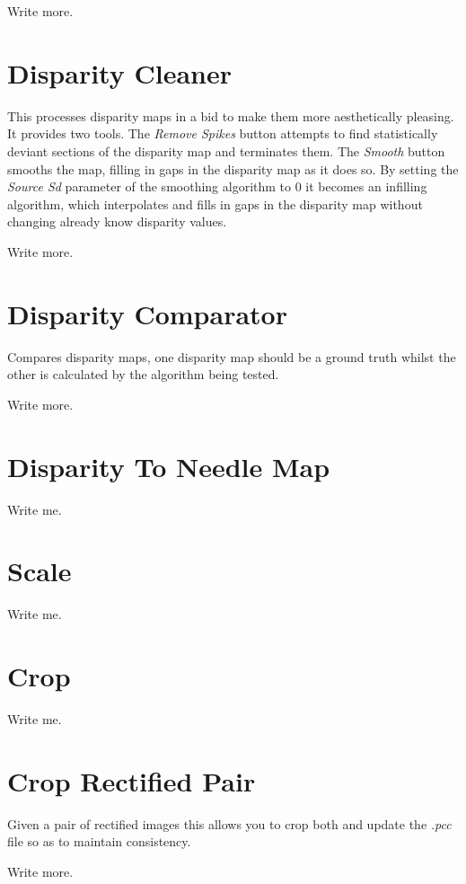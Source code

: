 \documentclass[10pt,a4paper,twoside]{article}
\begin{document}
Write more.



\section{Disparity Cleaner}
This processes disparity maps in a bid to make them more aesthetically pleasing.
It provides two tools.
The \emph{Remove Spikes} button attempts to find statistically deviant sections of the disparity map and terminates them.
The \emph{Smooth} button smooths the map, filling in gaps in the disparity map as it does so.
By setting the \emph{Source Sd} parameter of the smoothing algorithm to $0$ it becomes an infilling algorithm, which interpolates and fills in gaps in the disparity map without changing already know disparity values.

Write more.



\section{Disparity Comparator}
Compares disparity maps, one disparity map should be a ground truth whilst the other is calculated by the algorithm being tested.

Write more.



\section{Disparity To Needle Map}
Write me.



\section {Scale}
Write me.



\section{Crop}
Write me.



\section{Crop Rectified Pair}
Given a pair of rectified images this allows you to crop both and update the \emph{.pcc} file so as to maintain consistency.

Write more.
\end{document}
